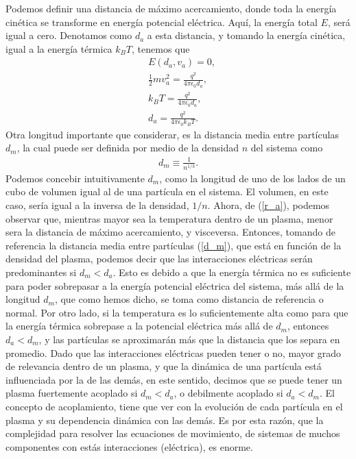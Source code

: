 \documentclass[../main.tex]{subfiles}
\begin{document}
Podemos definir una distancia de máximo acercamiento, donde toda la energía cinética se transforme en energía potencial eléctrica. Aquí, la energía total $E$, será igual a cero. Denotamos como $d_a$ a esta distancia, y tomando la energía cinética, igual a la energía térmica $k_B T$, tenemos que
\begin{align}
	&E(d_a,v_a) = 0, \\
	&\frac{1}{2}mv_a^2 = \frac{q^2}{4\pi\epsilon_0 d_a}, \\ 
	&k_BT = \frac{q^2}{4\pi\epsilon_0 d_a}, \\
	&d_a = \frac{q^2}{4\pi\epsilon_0 k_BT}. \label{r_a}
\end{align}
Otra longitud importante que considerar, es la distancia media entre partículas $d_m$, la cual puede ser definida por medio de la densidad $n$ del sistema como
\begin{align}
    d_m \equiv \frac{1}{n^{1/3}}. \label{d_m}
\end{align}
Podemos concebir intuitivamente $d_m$, como la longitud de uno de los lados de un cubo de volumen igual al de una partícula en el sistema. El volumen, en este caso, sería igual a la inversa de la densidad, $1/n$. Ahora, de (\ref{r_a}), podemos observar que, mientras mayor sea la temperatura dentro de un plasma, menor sera la distancia de máximo acercamiento, y visceversa. Entonces, tomando de referencia la distancia media entre partículas (\ref{d_m}), que está en función de la densidad del plasma, podemos decir que las interacciones eléctricas serán predominantes si $d_m < d_a$. Esto es debido a que la energía térmica no es suficiente para poder sobrepasar a la energía potencial eléctrica del sistema, más allá de la longitud $d_m$, que como hemos dicho, se toma como distancia de referencia o normal. Por otro lado, si la temperatura es lo suficientemente alta como para que la energía térmica sobrepase a la potencial eléctrica más allá de $d_m$, entonces $d_a < d_m$, y las partículas se aproximarán más que la distancia que los separa en promedio. Dado que las interacciones eléctricas pueden tener o no, mayor grado de relevancia dentro de un plasma, y que la dinámica de una partícula está influenciada por la de las demás, en este sentido, decimos que se puede tener un plasma fuertemente acoplado si $d_m < d_a$, o debilmente acoplado si $d_a < d_m$. El concepto de acoplamiento, tiene que ver con la evolución de cada partícula en el plasma y su dependencia dinámica con las demás. Es por esta razón, que la complejidad para resolver las ecuaciones de movimiento, de sistemas de muchos componentes con estás interacciones (eléctrica), es enorme.\\
\end{document}
